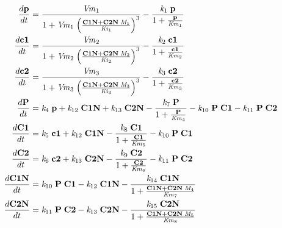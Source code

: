 {\begin{model}[h]
  \begin{align*}
    \frac{d\mathrm{\bf p}}{dt} &= \frac{\mathit{Vm}_{1}}{1 + \mathit{Vm}_{1} \; {\left(\frac{\mathrm{\bf C1N} + \mathrm{\bf C2N} \; \mathit{M}_{1}}{\mathit{Ki}_{1}}\right)}^{3}} - \frac{\mathit{k}_{1} \; \mathrm{\bf p}}{1 + \frac{\mathrm{\bf p}}{\mathit{Km}_{1}}} \\
    \frac{d\mathrm{\bf c1}}{dt} &= \frac{\mathit{Vm}_{2}}{1 + \mathit{Vm}_{2} \; {\left(\frac{\mathrm{\bf C1N} + \mathrm{\bf C2N} \; \mathit{M}_{2}}{\mathit{Ki}_{2}}\right)}^{3}} - \frac{\mathit{k}_{2} \; \mathrm{\bf c1}}{1 + \frac{\mathrm{\bf c1}}{\mathit{Km}_{2}}} \\
    \frac{d\mathrm{\bf c2}}{dt} &= \frac{\mathit{Vm}_{3}}{1 + \mathit{Vm}_{3} \; {\left(\frac{\mathrm{\bf C1N} + \mathrm{\bf C2N} \; \mathit{M}_{3}}{\mathit{Ki}_{3}}\right)}^{3}} - \frac{\mathit{k}_{3} \; \mathrm{\bf c2}}{1 + \frac{\mathrm{\bf c2}}{\mathit{Km}_{3}}} \\
    \frac{d\mathrm{\bf P}}{dt} &= \mathit{k}_{4} \; \mathrm{\bf p} + \mathit{k}_{12} \; \mathrm{\bf C1N} + \mathit{k}_{13} \; \mathrm{\bf C2N} - \frac{\mathit{k}_{7} \; \mathrm{\bf P}}{1 + \frac{\mathrm{\bf P}}{\mathit{Km}_{4}}} - \mathit{k}_{10} \; \mathrm{\bf P} \; \mathrm{\bf C1} - \mathit{k}_{11} \; \mathrm{\bf P} \; \mathrm{\bf C2} \\
    \frac{d\mathrm{\bf C1}}{dt} &= \mathit{k}_{5} \; \mathrm{\bf c1} + \mathit{k}_{12} \; \mathrm{\bf C1N} - \frac{\mathit{k}_{8} \; \mathrm{\bf C1}}{1 + \frac{\mathrm{\bf C1}}{\mathit{Km}_{5}}} - \mathit{k}_{10} \; \mathrm{\bf P} \; \mathrm{\bf C1} \\
    \frac{d\mathrm{\bf C2}}{dt} &= \mathit{k}_{6} \; \mathrm{\bf c2} + \mathit{k}_{13} \; \mathrm{\bf C2N} - \frac{\mathit{k}_{9} \; \mathrm{\bf C2}}{1 + \frac{\mathrm{\bf C2}}{\mathit{Km}_{6}}} - \mathit{k}_{11} \; \mathrm{\bf P} \; \mathrm{\bf C2} \\
    \frac{d\mathrm{\bf C1N}}{dt} &= \mathit{k}_{10} \; \mathrm{\bf P} \; \mathrm{\bf C1} - \mathit{k}_{12} \; \mathrm{\bf C1N} - \frac{\mathit{k}_{14} \; \mathrm{\bf C1N}}{1 + \frac{\mathrm{\bf C1N} + \mathrm{\bf C2N} \; \mathit{M}_{4}}{\mathit{Km}_{7}}} \\
    \frac{d\mathrm{\bf C2N}}{dt} &= \mathit{k}_{11} \; \mathrm{\bf P} \; \mathrm{\bf C2} - \mathit{k}_{13} \; \mathrm{\bf C2N} - \frac{\mathit{k}_{15} \; \mathrm{\bf C2N}}{1 + \frac{\mathrm{\bf C1N} + \mathrm{\bf C2N} \; \mathit{M}_{5}}{\mathit{Km}_{8}}} 
  \end{align*}
  \label{mod:hirota2}
\end{model}


}
